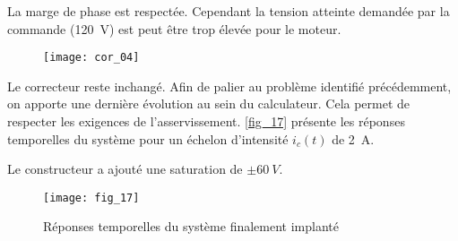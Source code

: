 \fi

\ifprof
\begin{corrige}
La marge de phase est respectée. Cependant la tension atteinte demandée par la commande (\SI{120}{V}) est peut être trop élevée pour le moteur. 
\begin{figure}[H]
\centering
\texttt{[image: cor\_04]}
\end{figure}
\end{corrige}
\else
\fi


Le correcteur reste inchangé. Afin de palier au problème identifié précédemment, on apporte une dernière évolution au sein du calculateur. Cela permet de respecter les exigences de l’asservissement. \autoref{fig_17} présente les réponses temporelles du système pour un échelon d’intensité $i_c(t)$ de \SI{2}{A}.

\ifprof
\begin{corrige}
Le constructeur a ajouté une saturation de $\pm \SI{60}{V}$.
\end{corrige}
\else



\begin{figure}[H]
\centering
\texttt{[image: fig\_17]}
\caption{Réponses temporelles du système finalement implanté\label{fig_17}}
\end{figure}

\fi


\ifprof
\else
\ifcolle
\else
{}
\fi
\fi

\ifprof
\else
\begin{marginfigure}
\centering
{}
\end{marginfigure}
\fi
